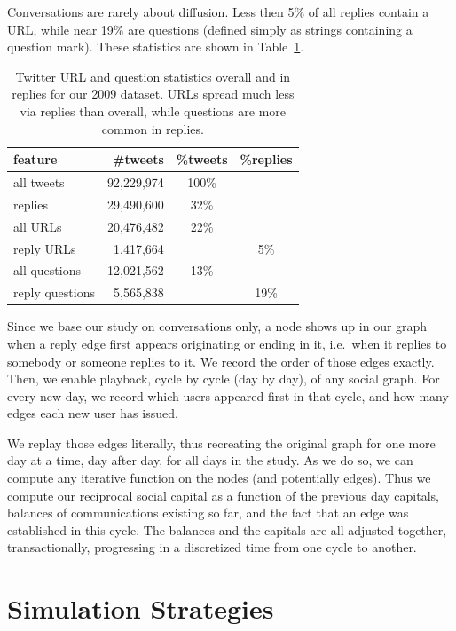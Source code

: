 \documentclass[10pt,oneside]{memoir}
\begin{document}
Conversations are rarely about diffusion.  Less then 5\% of all replies contain a URL, while near 19\% are questions (defined simply as strings containing a question mark).  These statistics are shown in Table~\ref{table:reply-stats}.



\begin{table}
\begin{tabular}{|lrcc|}
\toprule
feature & \#tweets & \%tweets & \%replies \\
\midrule
all tweets & 92,229,974 & 100\% & \space\\
replies & 29,490,600 & 32\% & \space \\
all URLs & 20,476,482 &  22\% & \space \\
reply URLs & 1,417,664 & \space & 5\% \\
all questions & 12,021,562 & 13\% & \space \\
reply questions & 5,565,838 & \space & 19\% \\
\bottomrule
\end{tabular}
\label{table:reply-stats}
\caption{Twitter URL and question statistics overall and in replies for our 2009 dataset.  URLs spread much less via replies than overall, while questions are more common in replies.}
\end{table}
Since we base our study on conversations only, a node shows up in our graph when a reply edge first appears originating or ending in it, i.e.\ when it replies to somebody or someone replies to it.  We record the order of those edges exactly.
Then, we enable playback, cycle by cycle (day by day), of any social graph.  For every new day, we record which users appeared first in that cycle, and how many edges each new user has issued.


We replay those edges literally, thus recreating the original graph for one more day at a time, day after day, for all days in the study.  As we do so, we can compute any iterative function on the nodes (and potentially edges).  Thus we compute our reciprocal social capital as a function of the previous day capitals, balances of communications existing so far, and the fact that an edge was established in this cycle.  The balances and the capitals are all adjusted together, transactionally, progressing in a discretized time from one cycle to another.


\pagebreak \section{Simulation Strategies}
\label{simulationstrategies}
\end{document}
